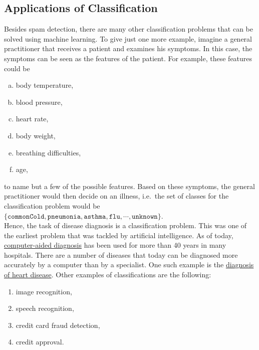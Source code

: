 \subsection{Applications of Classification}
Besides spam detection, there are many other classification problems that can be solved using machine learning.  To give
just one more example, imagine a general practitioner that receives a patient and examines his symptoms.  In this case,
the symptoms can be seen as the features of the patient.  For example, these features could be
\begin{enumerate}[(a)]
\item body temperature,
\item blood pressure,
\item heart rate,
\item body weight,
\item breathing difficulties,
\item age,
\end{enumerate}
to name but a few of the possible features.  Based on these symptoms, the general practitioner would then decide on an
illness, i.e.~the set of classes for the classification problem would be
\\[0.2cm]
\hspace*{1.3cm}
$\{ \mathtt{commonCold}, \mathtt{pneumonia}, \mathtt{asthma}, \mathtt{flu}, \cdots, \mathtt{unknown} \}$.
\\[0.2cm]
Hence, the task of disease diagnosis is a classification problem.  This was one of the earliest problem that was tackled
by artificial intelligence.  As of today, 
\href{https://en.wikipedia.org/wiki/Computer-aided_diagnosis}{computer-aided diagnosis} has been used for more than 40
years in many hospitals.  There are a number of diseases that today can be diagnosed more accurately by a
computer than by a specialist.  One such example is the  \href{http://www.ultromics.com}{diagnosis of heart disease}.
Other examples of classifications are the following:
\begin{enumerate}
\item image recognition,
\item speech recognition,
\item credit card fraud detection,
\item credit approval.
\end{enumerate}

